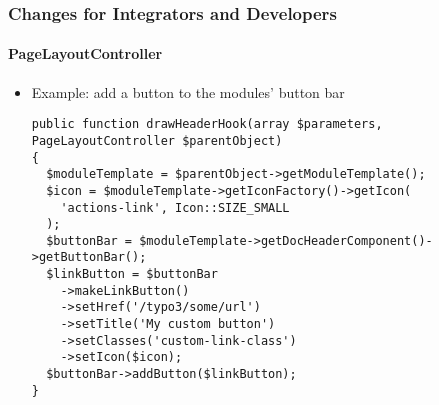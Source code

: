 %

\begin{frame}[fragile]
	\frametitle{Changes for Integrators and Developers}
	\framesubtitle{PageLayoutController}


	\begin{itemize}
		\item Example: add a button to the modules' button bar
\begin{lstlisting}
public function drawHeaderHook(array $parameters, PageLayoutController $parentObject)
{
  $moduleTemplate = $parentObject->getModuleTemplate();
  $icon = $moduleTemplate->getIconFactory()->getIcon(
    'actions-link', Icon::SIZE_SMALL
  );
  $buttonBar = $moduleTemplate->getDocHeaderComponent()->getButtonBar();
  $linkButton = $buttonBar
    ->makeLinkButton()
    ->setHref('/typo3/some/url')
    ->setTitle('My custom button')
    ->setClasses('custom-link-class')
    ->setIcon($icon);
  $buttonBar->addButton($linkButton);
}
\end{lstlisting}

	\end{itemize}

\end{frame}

